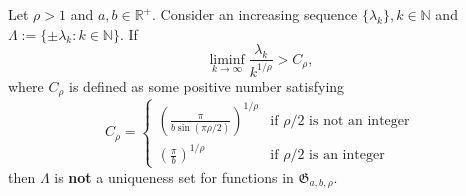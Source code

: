\documentclass[graybox]{svmult}
\newcommand{\R}{\mathbb{R}}
\newcommand{\N}{\mathbb{N}}
\newcommand{\fG}{\mathfrak{G}}
\begin{document}
\begin{proposition}\label{Existence}
    Let $\rho > 1$ and $a, b \in \R^+$. Consider an increasing sequence $\{ \lambda_k \}, k \in \N$ and $\Lambda := \{ \pm \lambda_k: k \in \N \}$. If
    \begin{equation*}
        \liminf_{k \to \infty} \frac{\lambda_k}{k^{1/\rho}} > C_\rho, 
    \end{equation*}
    where $C_\rho$ is defined as some positive number satisfying
    \begin{equation*}
        C_\rho = 
        \begin{cases} 
            \left( \frac{\pi}{b \sin(\pi\rho/2)} \right)^{1/\rho} & \text{if } \rho/2 \text{ is not an integer} \\
            \left( \frac{\pi}{b} \right)^{1/\rho} & \text{if } \rho/2 \text{ is an integer}
        \end{cases}
    \end{equation*}
    then $\Lambda$ is \textbf{not} a uniqueness set for  functions in $\fG_{a,b,\rho}$.
\end{proposition}
\end{document}
